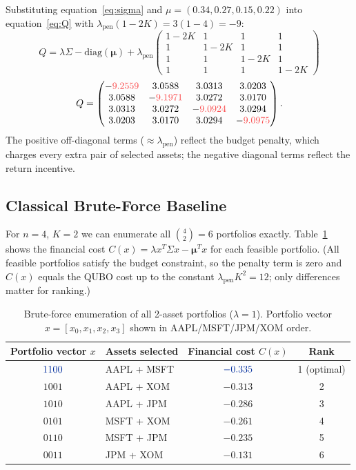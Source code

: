 \documentclass[a4paper,11pt]{article}
\newcommand{\crd}[1]{\textcolor{ibmred}{#1}}
\newcommand{\cblu}[1]{\textcolor{ibmblue}{#1}}
\begin{document}
\begin{mathbox}[QUBO Matrix for $n=4$, $K=2$, $\lambda=1$, $\lambda_\text{pen}=3$]
Substituting equation~\eqref{eq:sigma} and $\mu = (0.34, 0.27, 0.15, 0.22)$
into equation~\eqref{eq:Q} with $\lambda_\text{pen}(1-2K) = 3(1-4) = -9$:
\[
    Q = \lambda\Sigma - \mathrm{diag}(\boldsymbol\mu)
    + \lambda_\text{pen}
    \begin{pmatrix}
        1-2K & 1 & 1 & 1 \\
        1 & 1-2K & 1 & 1 \\
        1 & 1 & 1-2K & 1 \\
        1 & 1 & 1 & 1-2K
    \end{pmatrix}
\]
\[
    Q = \begin{pmatrix}
        -\crd{9.2559} & 3.0588 & 3.0313 & 3.0203 \\
        3.0588 & -\crd{9.1971} & 3.0272 & 3.0170 \\
        3.0313 & 3.0272 & -\crd{9.0924} & 3.0294 \\
        3.0203 & 3.0170 & 3.0294 & -\crd{9.0975}
    \end{pmatrix}.
\]
The positive off-diagonal terms ($\approx\lambda_\text{pen}$) reflect the budget
penalty, which charges every extra pair of selected assets;
the negative diagonal terms reflect the return incentive.
\end{mathbox}

\subsection{Classical Brute-Force Baseline}

For $n=4$, $K=2$ we can enumerate all $\binom{4}{2}=6$ portfolios
exactly. Table~\ref{tab:bf} shows the financial cost
$C(x)=\lambda x^T\Sigma x - \boldsymbol\mu^T x$ for each feasible
portfolio. (All feasible portfolios satisfy the budget constraint, so the
penalty term is zero and $C(x)$ equals the QUBO cost up to the constant
$\lambda_\text{pen}K^2=12$; only differences matter for ranking.)

\begin{table}[H]
\centering
\caption{Brute-force enumeration of all 2-asset portfolios ($\lambda=1$).
Portfolio vector $x=[x_0,x_1,x_2,x_3]$ shown in AAPL/MSFT/JPM/XOM order.}
\label{tab:bf}
\begin{tabular}{clcc}
    \toprule
    Portfolio vector $x$ & Assets selected & Financial cost $C(x)$ & Rank \\
    \midrule
    $\cblu{1100}$ & \cblu{AAPL + MSFT} & $\cblu{-0.335}$ & \cblu{1 (optimal)} \\
    $1001$ & AAPL + XOM        & $-0.313$ & 2 \\
    $1010$ & AAPL + JPM        & $-0.286$ & 3 \\
    $0101$ & MSFT + XOM        & $-0.261$ & 4 \\
    $0110$ & MSFT + JPM        & $-0.235$ & 5 \\
    $0011$ & JPM  + XOM        & $-0.131$ & 6 \\
    \bottomrule
\end{tabular}
\end{table}
\end{document}
